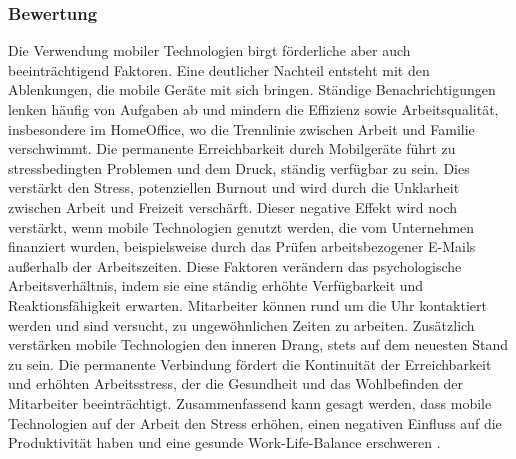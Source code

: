 \documentclass[12pt,a4paper]{article}
\begin{document}
\subsubsection*{Bewertung}
Die Verwendung mobiler Technologien birgt förderliche aber auch beeinträchtigend Faktoren. Eine deutlicher Nachteil entsteht mit den Ablenkungen, die mobile Geräte mit sich bringen. Ständige Benachrichtigungen lenken häufig von Aufgaben ab und mindern die Effizienz sowie Arbeitsqualität, insbesondere im HomeOffice, wo die Trennlinie zwischen Arbeit und Familie verschwimmt. Die permanente Erreichbarkeit durch Mobilgeräte führt zu stressbedingten Problemen und dem Druck, ständig verfügbar zu sein. Dies verstärkt den Stress, potenziellen Burnout und wird durch die Unklarheit zwischen Arbeit und Freizeit verschärft. Dieser negative Effekt wird noch verstärkt, wenn mobile Technologien genutzt werden, die vom Unternehmen finanziert wurden, beispielsweise durch das Prüfen arbeitsbezogener E-Mails außerhalb der Arbeitszeiten. Diese Faktoren verändern das psychologische Arbeitsverhältnis, indem sie eine ständig erhöhte Verfügbarkeit und Reaktionsfähigkeit erwarten. Mitarbeiter können rund um die Uhr kontaktiert werden und sind versucht, zu ungewöhnlichen Zeiten zu arbeiten. Zusätzlich verstärken mobile Technologien den inneren Drang, stets auf dem neuesten Stand zu sein. Die permanente Verbindung fördert die Kontinuität der Erreichbarkeit und erhöhten Arbeitsstress, der die Gesundheit und das Wohlbefinden der Mitarbeiter beeinträchtigt. Zusammenfassend kann gesagt werden, dass mobile Technologien auf der Arbeit den Stress erhöhen, einen negativen Einfluss auf die Produktivität haben und eine gesunde Work-Life-Balance erschweren \parencite[vgl.][]{sarker2012managing}. 
\end{document}
